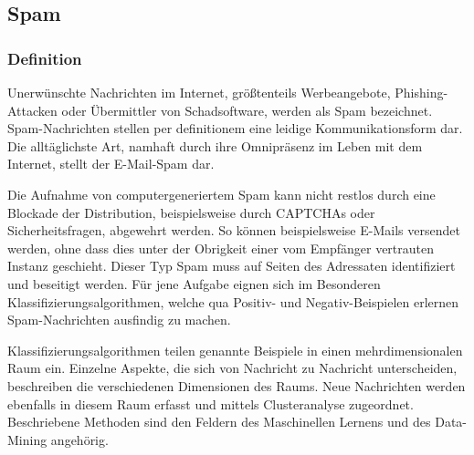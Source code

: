 \subsection{Spam} %
\label{sub:spam}
\subsubsection{Definition} %
\label{ssub:definition}
Unerwünschte Nachrichten im Internet, größtenteils Werbeangebote, Phishing-Attacken oder Übermittler von Schadsoftware, werden als Spam bezeichnet. Spam-Nachrichten stellen per definitionem eine leidige Kommunikationsform dar. Die alltäglichste Art, namhaft durch ihre Omnipräsenz im Leben mit dem Internet, stellt der E-Mail-Spam dar.

Die Aufnahme von computergeneriertem Spam kann nicht restlos durch eine Blockade der Distribution, beispielsweise durch CAPTCHAs oder Sicherheitsfragen, abgewehrt werden. So können beispielsweise E-Mails versendet werden, ohne dass dies unter der Obrigkeit einer vom Empfänger vertrauten Instanz geschieht. Dieser Typ Spam muss auf Seiten des Adressaten identifiziert und beseitigt werden. Für jene Aufgabe eignen sich im Besonderen Klassifizierungsalgorithmen, welche qua Positiv- und Negativ-Beispielen erlernen Spam-Nachrichten ausfindig zu machen.

Klassifizierungsalgorithmen teilen genannte Beispiele in einen mehrdimensionalen Raum ein. Einzelne Aspekte, die sich von Nachricht zu Nachricht unterscheiden, beschreiben die verschiedenen Dimensionen des Raums. Neue Nachrichten werden ebenfalls in diesem Raum erfasst und mittels Clusteranalyse zugeordnet. Beschriebene Methoden sind den Feldern des Maschinellen Lernens und des Data-Mining angehörig.
